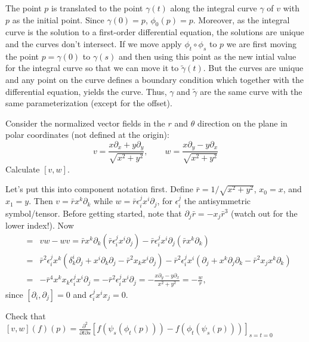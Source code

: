 {The point $p$ is translated to the point $\gamma(t)$ along the integral curve $\gamma$ of $v$ with $p$
as the initial point. Since $\gamma(0)=p$, $\phi_0(p)=p$. Moreover, as the integral curve is the solution
to a first-order differential equation, the solutions are unique and the curves don't intersect. If we move
apply $\phi_t\circ\phi_s$ to $p$ we are first moving the point $p=\gamma(0)$ to $\gamma(s)$ and then using
this point as the new intial value for the integral curve so that we can move it to $\widetilde{\gamma}(t)$. But 
the curves are unique and any point on the curve defines a boundary condition which together with
the differential equation, yields the curve. Thus, $\gamma$ and $\widetilde{\gamma}$ are the same curve
with the same parameterization (except for the offset).

\begin{p}
{Consider the normalized vector fields in the $r$ and $\theta$ direction on the plane in polar coordinates (not defined at the origin):
\[
v=\frac{x\partial_x+y\partial_y}{\sqrt{x^2+y^2}},\qquad w=\frac{x\partial_y-y\partial_x}{\sqrt{x^2+y^2}}
\]
Calculate $[v,w]$}.
\end{p}

Let's put this into component notation first. Define $\bar{r}=1/\sqrt{x^2+y^2}$,
$x_0=x$, and $x_1=y$. Then $v=\bar{r}x^k\partial_k$ while $w=\bar{r}\epsilon^j_i x^i\partial_j$, for $\epsilon^j_i$ the antisymmetric symbol/tensor. Before getting started, note that $\partial_j\bar{r}=-x_j\bar{r}^3$ (watch out for the lower index!). Now
\begin{eqnarray*}
[v,w]&=&vw-wv=\bar{r}x^k\partial_k(\bar{r}\epsilon^j_ix^i\partial_j)-
\bar{r}\epsilon^j_ix^i\partial_j(\bar{r}x^k\partial_k)\\
&=&\bar{r}^2\epsilon^j_ix^k\left(\delta_k^i\partial_j+x^i\partial_k\partial_j-\bar{r}^2x_k x^i\partial_j\right)-\bar{r}^2\epsilon^j_i x^i\left(\partial_j+x^k\partial_j\partial_k-\bar{r}^2 x_j x^k\partial_k\right)\\
&=&-\bar{r}^4x^kx_k\epsilon^j_i x^i\partial_j=-\bar{r}^2\epsilon^j_i x^i\partial_j=-\frac{x\partial_y-y\partial_x}{x^2+y^2}=-\frac{w}{r},
\end{eqnarray*}
since $[\partial_i,\partial_j]=0$ and $\epsilon^j_ix^ix_j=0$.

\begin{p}{Check that $[v,w](f)(p)=\frac{\partial^2}{\partial t \partial s}\left[
f(\psi_s(\phi_t(p)))-f(\phi_t(\psi_s(p)))\right]_{s=t=0}$}
\end{p}

}
